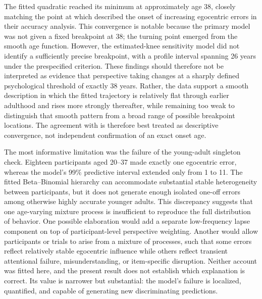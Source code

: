 \documentclass[11pt]{article}
\begin{document}
The fitted quadratic reached its minimum at approximately age 38, closely
matching the point at which \citet{bradford2023} described the onset of
increasing egocentric errors in their accuracy analysis. This convergence is
notable because the primary model was not given a fixed breakpoint at 38; the
turning point emerged from the smooth age function. However, the estimated-knee
sensitivity model did not identify a sufficiently precise breakpoint, with a
profile interval spanning 26 years under the prespecified criterion. These
findings should therefore not be interpreted as evidence that perspective
taking changes at a sharply defined psychological threshold of exactly 38
years. Rather, the data support a smooth description in which the fitted
trajectory is relatively flat through earlier adulthood and rises more strongly
thereafter, while remaining too weak to distinguish that smooth pattern from a
broad range of possible breakpoint locations. The agreement with
\citet{bradford2023} is therefore best treated as descriptive convergence, not
independent confirmation of an exact onset age.

The most informative limitation was the failure of the young-adult singleton
check. Eighteen participants aged 20--37 made exactly one egocentric error,
whereas the model's 99\% predictive interval extended only from 1 to 11. The
fitted Beta--Binomial hierarchy can accommodate substantial stable heterogeneity
between participants, but it does not generate enough isolated one-off errors
among otherwise highly accurate younger adults. This discrepancy suggests that
one age-varying mixture process is insufficient to reproduce the full
distribution of behavior. One possible elaboration would add a separate
low-frequency lapse component on top of participant-level perspective
weighting. Another would allow participants or trials to arise from a mixture
of processes, such that some errors reflect relatively stable egocentric
influence while others reflect transient attentional failure, misunderstanding,
or item-specific disruption. Neither account was fitted here, and the present
result does not establish which explanation is correct. Its value is narrower
but substantial: the model's failure is localized, quantified, and capable of
generating new discriminating predictions.
\end{document}
